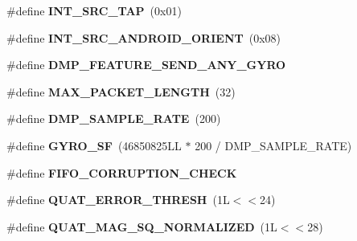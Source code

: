 \begin{DoxyCompactItemize}
\item 
\#define {\bfseries I\+N\+T\+\_\+\+S\+R\+C\+\_\+\+T\+AP}~(0x01)\hypertarget{group___d_r_i_v_e_r_s_gac5690dcf21f75f38bc3ea13ad4799714}{}\label{group___d_r_i_v_e_r_s_gac5690dcf21f75f38bc3ea13ad4799714}

\item 
\#define {\bfseries I\+N\+T\+\_\+\+S\+R\+C\+\_\+\+A\+N\+D\+R\+O\+I\+D\+\_\+\+O\+R\+I\+E\+NT}~(0x08)\hypertarget{group___d_r_i_v_e_r_s_ga7c3f4a57d404a1321ce6dfc00e33ac4d}{}\label{group___d_r_i_v_e_r_s_ga7c3f4a57d404a1321ce6dfc00e33ac4d}

\item 
\#define {\bfseries D\+M\+P\+\_\+\+F\+E\+A\+T\+U\+R\+E\+\_\+\+S\+E\+N\+D\+\_\+\+A\+N\+Y\+\_\+\+G\+Y\+RO}
\item 
\#define {\bfseries M\+A\+X\+\_\+\+P\+A\+C\+K\+E\+T\+\_\+\+L\+E\+N\+G\+TH}~(32)\hypertarget{group___d_r_i_v_e_r_s_ga973c680573b37fc359fc68d0707da355}{}\label{group___d_r_i_v_e_r_s_ga973c680573b37fc359fc68d0707da355}

\item 
\#define {\bfseries D\+M\+P\+\_\+\+S\+A\+M\+P\+L\+E\+\_\+\+R\+A\+TE}~(200)\hypertarget{group___d_r_i_v_e_r_s_ga9d0f0425cbcb58186500cb8686e41e67}{}\label{group___d_r_i_v_e_r_s_ga9d0f0425cbcb58186500cb8686e41e67}

\item 
\#define {\bfseries G\+Y\+R\+O\+\_\+\+SF}~(46850825\+L\+L $\ast$ 200 / D\+M\+P\+\_\+\+S\+A\+M\+P\+L\+E\+\_\+\+R\+A\+T\+E)\hypertarget{group___d_r_i_v_e_r_s_gac0325c658f2911bdfc3b44fca31c684f}{}\label{group___d_r_i_v_e_r_s_gac0325c658f2911bdfc3b44fca31c684f}

\item 
\#define {\bfseries F\+I\+F\+O\+\_\+\+C\+O\+R\+R\+U\+P\+T\+I\+O\+N\+\_\+\+C\+H\+E\+CK}\hypertarget{group___d_r_i_v_e_r_s_gabb3bcb4d19c847aa89a356478b7da027}{}\label{group___d_r_i_v_e_r_s_gabb3bcb4d19c847aa89a356478b7da027}

\item 
\#define {\bfseries Q\+U\+A\+T\+\_\+\+E\+R\+R\+O\+R\+\_\+\+T\+H\+R\+E\+SH}~(1\+L$<$$<$24)\hypertarget{group___d_r_i_v_e_r_s_ga633dcbd524d41e6f76c0fda39828c8e1}{}\label{group___d_r_i_v_e_r_s_ga633dcbd524d41e6f76c0fda39828c8e1}

\item 
\#define {\bfseries Q\+U\+A\+T\+\_\+\+M\+A\+G\+\_\+\+S\+Q\+\_\+\+N\+O\+R\+M\+A\+L\+I\+Z\+ED}~(1\+L$<$$<$28)\hypertarget{group___d_r_i_v_e_r_s_ga290880f86641e11d62db9792eab808bd}{}\label{group___d_r_i_v_e_r_s_ga290880f86641e11d62db9792eab808bd}


\end{DoxyCompactItemize}
